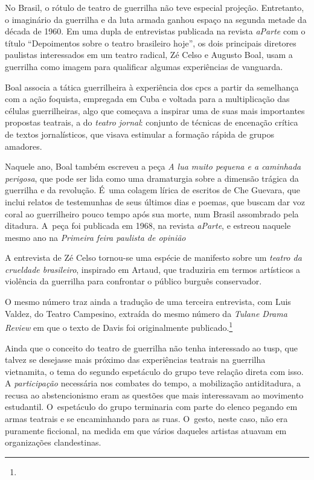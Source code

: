 {\subject{Brasil: a guerrilha no teatro}

No Brasil, o rótulo de teatro de guerrilha não teve especial projeção.
Entretanto, o imaginário da guerrilha e da luta armada ganhou espaço na
segunda metade da década de 1960. Em uma dupla de entrevistas publicada
na revista {\it aParte} com o título “Depoimentos sobre o teatro
brasileiro hoje”, os dois principais diretores paulistas interessados em
um teatro radical, Zé Celso e Augusto Boal, usam a guerrilha como imagem
para qualificar algumas experiências de vanguarda.

Boal associa a tática guerrilheira à experiência dos {\sc cpc}s a partir da
semelhança com a ação foquista, empregada em Cuba e voltada para a
multiplicação das células guerrilheiras, algo que começava
a inspirar uma de suas mais importantes propostas teatrais, a do
{\it teatro jornal}: conjunto de técnicas de encenação crítica de textos
jornalísticos, que visava estimular a formação rápida de grupos
amadores.

Naquele ano, Boal também escreveu a peça {\it A lua muito
pequena e a caminhada perigosa}, que pode ser lida como uma dramaturgia
sobre a dimensão trágica da guerrilha e da revolução. É~uma colagem
lírica de escritos de Che Guevara, que inclui relatos de testemunhas de
seus últimos dias e poemas, que buscam dar voz coral ao guerrilheiro
pouco tempo após sua morte, num Brasil assombrado pela ditadura. A~peça
foi publicada em 1968, na revista {\it aParte}, e estreou naquele mesmo
ano na {\it Primeira feira paulista de opinião}

A entrevista de Zé Celso tornou-se uma espécie de manifesto sobre um
{\it teatro da crueldade brasileiro}, inspirado em Artaud, que
traduziria em termos artísticos a violência da guerrilha para confrontar
o público burguês conservador.

O mesmo número traz ainda a tradução de uma terceira entrevista, com
Luis Valdez, do Teatro Campesino, extraída do mesmo número da
{\it Tulane Drama Review} em que o texto de Davis foi originalmente
publicado.\footnote{}

\column

Ainda que o conceito do teatro de guerrilha não tenha interessado ao
{\sc tusp}, que talvez se desejasse mais próximo das experiências teatrais na
guerrilha vietnamita, o tema do segundo espetáculo do grupo teve relação
direta com isso. A {\it participação} necessária nos combates do tempo,
a mobilização antiditadura, a recusa ao abstencionismo eram as questões
que mais interessavam ao movimento estudantil. O~espetáculo do
grupo terminaria com parte do elenco pegando em armas teatrais e se
encaminhando para as ruas. O~gesto, neste caso, não era puramente
ficcional, na medida em que vários daqueles artistas atuavam em
organizações clandestinas.

}
